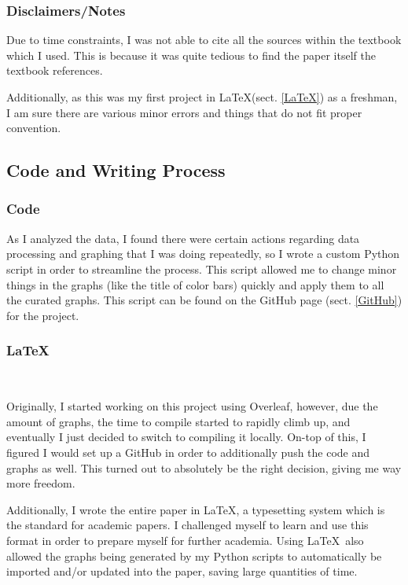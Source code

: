 \documentclass[12pt, a4paper]{article}
\begin{document}
    \subsubsection{Disclaimers/Notes}
        Due to time constraints, I was not able to cite all the sources within the textbook \parencite{TaurisvandenHeuvel+2023} which I used. This is because it was quite tedious to find the paper itself the textbook references. 

        Additionally, as this was my first project in \LaTeX (sect. \ref{LaTeX}) as a freshman, I am sure there are various minor errors and things that do not fit proper convention. 

    \subsection{Code and Writing Process}
        \subsubsection{Code}

            As I analyzed the data, I found there were certain actions regarding data processing and graphing that I was doing repeatedly, so I wrote a custom Python script in order to streamline the process. This script allowed me to change minor things in the graphs (like the title of color bars) quickly and apply them to all the curated graphs. This script can be found on the GitHub page (sect. \ref{GitHub}) for the project. 

        \subsubsection{\LaTeX}~\label{LaTeX}
        
            Originally, I started working on this project using Overleaf, however, due the amount of graphs, the time to compile started to rapidly climb up, and eventually I just decided to switch to compiling it locally. On-top of this, I figured I would set up a GitHub in order to additionally push the code and graphs as well. This turned out to absolutely be the right decision, giving me way more freedom.

            Additionally, I wrote the entire paper in \LaTeX, a typesetting system which is the standard for academic papers. I challenged myself to learn and use this format in order to prepare myself for further academia. Using \LaTeX ~also allowed the graphs being generated by my Python scripts to automatically be imported and/or updated into the paper, saving large quantities of time.
\end{document}
